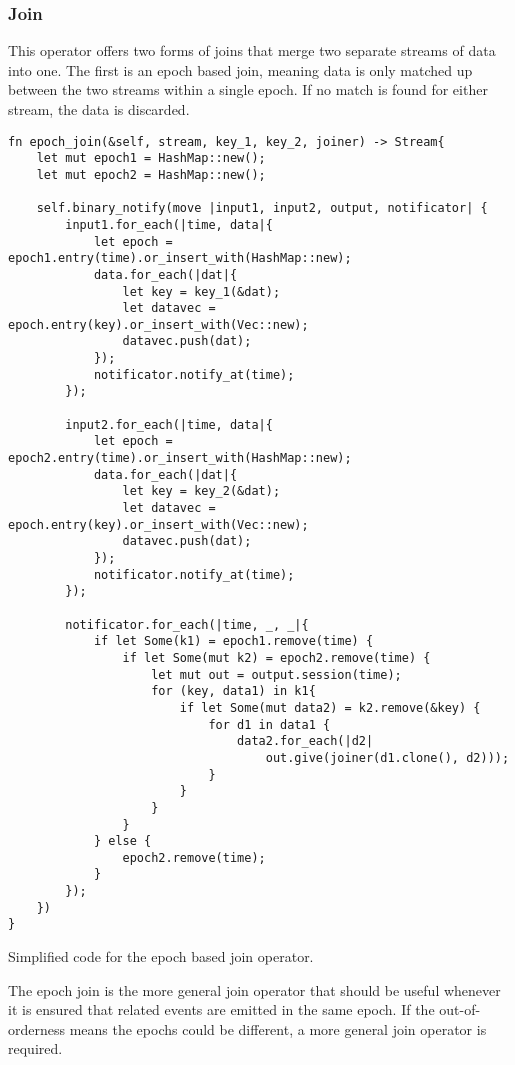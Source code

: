 \subsubsection{Join}
This operator offers two forms of joins that merge two separate streams of data into one. The first is an epoch based join, meaning data is only matched up between the two streams within a single epoch. If no match is found for either stream, the data is discarded.

\begin{listing}[H]
\begin{verbatim}
fn epoch_join(&self, stream, key_1, key_2, joiner) -> Stream{
    let mut epoch1 = HashMap::new();
    let mut epoch2 = HashMap::new();
    
    self.binary_notify(move |input1, input2, output, notificator| {
        input1.for_each(|time, data|{
            let epoch = epoch1.entry(time).or_insert_with(HashMap::new);
            data.for_each(|dat|{
                let key = key_1(&dat);
                let datavec = epoch.entry(key).or_insert_with(Vec::new);
                datavec.push(dat);
            });
            notificator.notify_at(time);
        });
        
        input2.for_each(|time, data|{
            let epoch = epoch2.entry(time).or_insert_with(HashMap::new);
            data.for_each(|dat|{
                let key = key_2(&dat);
                let datavec = epoch.entry(key).or_insert_with(Vec::new);
                datavec.push(dat);
            });
            notificator.notify_at(time);
        });
        
        notificator.for_each(|time, _, _|{
            if let Some(k1) = epoch1.remove(time) {
                if let Some(mut k2) = epoch2.remove(time) {
                    let mut out = output.session(time);
                    for (key, data1) in k1{
                        if let Some(mut data2) = k2.remove(&key) {
                            for d1 in data1 {
                                data2.for_each(|d2|
                                    out.give(joiner(d1.clone(), d2)));
                            }
                        }
                    }
                }
            } else {
                epoch2.remove(time);
            }
        });
    })
}
\end{verbatim}
  \caption{Simplified code for the epoch based join operator.}
  \label{lst:epoch-join}
\end{listing}

The epoch join is the more general join operator that should be useful whenever it is ensured that related events are emitted in the same epoch. If the out-of-orderness means the epochs could be different, a more general join operator is required.

